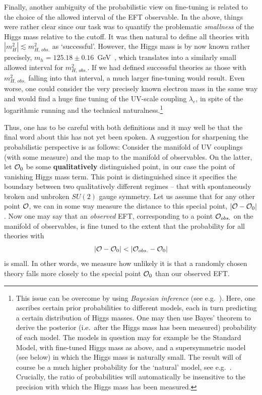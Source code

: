 \documentclass[12pt]{article}
\newcommand{\be}{\begin{equation}}
\newcommand{\ee}{\end{equation}}
\numberwithin{equation}{section}
\begin{document}
Finally, another ambiguity of the probabilistic view on fine-tuning is related to the choice of the allowed interval of the EFT observable. In the above, things were rather clear since our task was to quantify the problematic {\it smallness} of the Higgs mass relative to the cutoff. It was then natural to define all theories with $|m_H^2|\lesssim m_{H,\,obs.}^2$ as `successful'. However, the Higgs mass is by now known rather precisely, $m_h=125.18\pm 0.16$~GeV~\cite{Tanabashi:2018oca}, which translates into a similarly small allowed interval for $m_{H,\,obs.}^2$. If we had defined successful theories as those with $m^2_{H,\,obs.}$ falling into that interval, a much larger fine-tuning would result. Even worse, one could consider the very precisely known electron mass in the same way and would find a huge fine tuning of the UV-scale coupling $\lambda_e$, in spite of the logarithmic running and the technical naturalness.\footnote{This issue can be overcome by using {\it Bayesian inference} (see e.g.~\cite{Kass:1995loi, Trotta:2008qt}). Here, one  ascribes certain prior probabilities  to different models, each in turn predicting a certain distribution of Higgs masses. One may then use Bayes' theorem to derive the posterior (i.e.~after the Higgs mass has been measured) probability of each model. The models in question may for example be the Standard Model, with fine-tuned Higgs mass as above, and a supersymmetric model (see below) in which the Higgs mass is naturally small. The result will of course be a much higher probability for the `natural' model, see e.g.~\cite{Allanach:2007qk, Cabrera:2008tj, Fichet:2012sn, Fowlie:2014xha}. Crucially, the ratio of probabilities will automatically be insensitive to the precision with which the Higgs mass has been measured.
}

Thus, one has to be careful with both definitions and it may well be that the final word about this has not yet been spoken. A suggestion for sharpening the probabilistic perspective is as follows: Consider the manifold of UV couplings (with some measure) and the map to the manifold of observables. On the latter, let ${\cal O}_0$ be some {\bf qualitatively} distinguished point, in our case the point of vanishing Higgs mass term. This point is distinguished since it specifies the boundary between two qualitatively different regimes -- that with spontaneously broken and unbroken $SU(2)$ gauge symmetry.  Let us assume that for any other point ${\cal O}$, we can in some way measure the distance to this special point, $|{\cal O}-{\cal O}_0|$. Now one may say that an {\it observed} EFT, corresponding to a point ${\cal O}_{obs.}$ on the manifold of observables, is fine tuned to the extent that the probability for all theories with 
\be
|{\cal O}-{\cal O}_0|<|{\cal O}_{obs.}-{\cal O}_0|
\ee
is small. In other words, we measure how unlikely it is that a randomly chosen theory falls more closely to the special point ${\cal O}_0$ than our observed EFT. 
\end{document}
